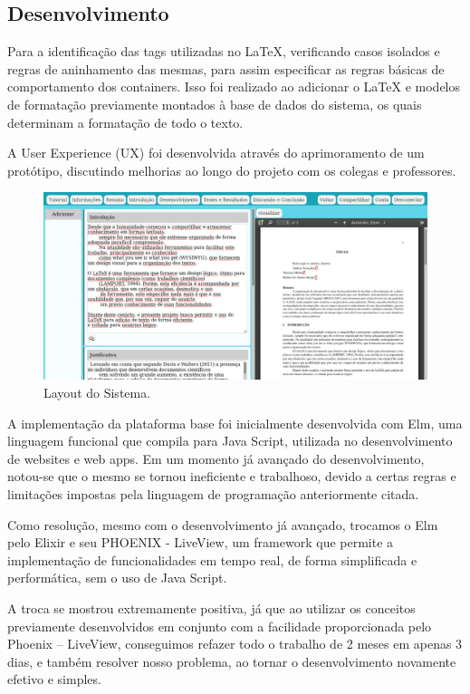 \documentclass[article,12pt,oneside,a4paper,english,brazil,sumario=tradicional]{abntex2}
\begin{document}
\subsection{Desenvolvimento}

Para a identificação das tags utilizadas no LaTeX, verificando casos isolados e regras de aninhamento das mesmas, para assim especificar as regras básicas de comportamento dos containers. Isso foi realizado ao adicionar o LaTeX e modelos de formatação previamente montados à base de dados do sistema, os quais determinam a formatação de todo o texto.

A User Experience (UX) foi desenvolvida através do aprimoramento de um protótipo, discutindo melhorias ao longo do projeto com os colegas e professores.


\begin{figure}[H]
  \centering
  \caption{Layout do Sistema.}
  \includegraphics[width=16cm]{figures/Tela Editar Projeto - FATEX.jpeg}
\end{figure}


A implementação da plataforma base foi inicialmente desenvolvida com Elm, uma linguagem funcional que compila para Java Script, utilizada no desenvolvimento de websites e web apps. Em um momento já avançado do desenvolvimento, notou-se que o mesmo se tornou ineficiente e trabalhoso, devido a certas regras e limitações impostas pela linguagem de programação anteriormente citada.

Como resolução, mesmo com o desenvolvimento já avançado, trocamos o Elm pelo Elixir e seu PHOENIX - LiveView, um framework que permite a implementação de funcionalidades em tempo real, de forma simplificada e performática, sem o uso de Java Script.

A troca se mostrou extremamente positiva, já que ao utilizar os conceitos previamente desenvolvidos em conjunto com a facilidade proporcionada pelo Phoenix – LiveView, conseguimos refazer todo o trabalho de 2 meses em apenas 3 dias, e também resolver nosso problema, ao tornar o desenvolvimento novamente efetivo e simples.
\end{document}
